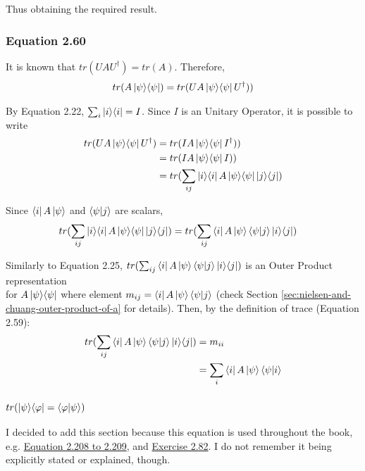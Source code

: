     Thus obtaining the required result.

\subsubsection{Equation 2.60}
\label{sec:nielsen-and-chuang-equation-2-60}
    It is known that $tr(U A U^\dagger) = tr(A)$. Therefore,
    \begin{align}
        tr(A \mathop{\mathinner{ |{\psi}\rangle \langle{\psi}|}}) = tr(U A \mathop{\mathinner{ |{\psi}\rangle \langle{\psi}|}} U^\dagger))
    \end{align}
    
    By Equation 2.22, $\sum_i \mathop{\mathinner{ |{i}\rangle \langle{i}|}} = I$.
    Since $I$ is an Unitary Operator, it is possible to write
    \begin{align}
        tr(U A \mathop{\mathinner{ |{\psi}\rangle \langle{\psi}|}} U^\dagger) &=
            tr(I A \mathop{\mathinner{ |{\psi}\rangle \langle{\psi}|}} I^\dagger)) \\
        &= tr(I A \mathop{\mathinner{ |{\psi}\rangle \langle{\psi}|}} I)) \\
        &= tr(\sum_{ij} \mathop{\mathinner{ |{i}\rangle \langle{i}|}} A \mathop{\mathinner{ |{\psi}\rangle \langle{\psi}|}} \mathop{\mathinner{ |{j}\rangle \langle{j}|}})
    \end{align}
    
    Since $\bra{i}A\ket{\psi}$ and $\mathop{\mathinner{ \langle{\psi}|{j}\rangle}}$ are scalars,
    \begin{align}
        tr(\sum_{ij} \mathop{\mathinner{ |{i}\rangle \langle{i}|}} A \mathop{\mathinner{ |{\psi}\rangle \langle{\psi}|}} \mathop{\mathinner{ |{j}\rangle \langle{j}|}}) &=
            tr(\sum_{ij} \bra{i}A\ket{\psi} \mathop{\mathinner{ \langle{\psi}|{j}\rangle}} \mathop{\mathinner{ |{i}\rangle \langle{j}|}})
    \end{align}
    
    Similarly to Equation 2.25,
    $tr(\sum_{ij} \bra{i}A\ket{\psi} \mathop{\mathinner{ \langle{\psi}|{j}\rangle}} \mathop{\mathinner{ |{i}\rangle \langle{j}|}})$
    is an Outer Product representation \\
    for $A\mathop{\mathinner{ |{\psi}\rangle \langle{\psi}|}}$
    where element $m_{ij} = \bra{i}A\ket{\psi} \mathop{\mathinner{ \langle{\psi}|{j}\rangle}}$
    (check Section \ref{sec:nielsen-and-chuang-outer-product-of-a} for details).
    Then, by the definition of trace (Equation 2.59):
    \begin{align}
        tr(\sum_{ij} \bra{i}A\ket{\psi} \mathop{\mathinner{ \langle{\psi}|{j}\rangle}} \mathop{\mathinner{ |{i}\rangle \langle{j}|}}) &=
            m_{ii} \\
        &= \sum_i \bra{i}A\ket{\psi} \mathop{\mathinner{ \langle{\psi}|{i}\rangle}}
    \end{align}
    
\subsubsection[Trace of ketbra equals braket]
{$tr(\mathop{\mathinner{ |{\psi}\rangle \langle{\varphi}|}} = \mathop{\mathinner{ \langle{\varphi}|{\psi}\rangle}})$}
\label{sec:nielsen-and-chuang-trace-of-ketbra-equals-braket}
    I decided to add this section because this equation is used
    throughout the book, e.g. \hyperref[sec:nielsen-and-chuang-equations-2-208-209]
    {Equation 2.208 to 2.209}, and
    \hyperref[sec:nielsen-and-chuang-exercise-2-82]{Exercise 2.82}.
    I do not remember it being explicitly stated or explained, though.
    
